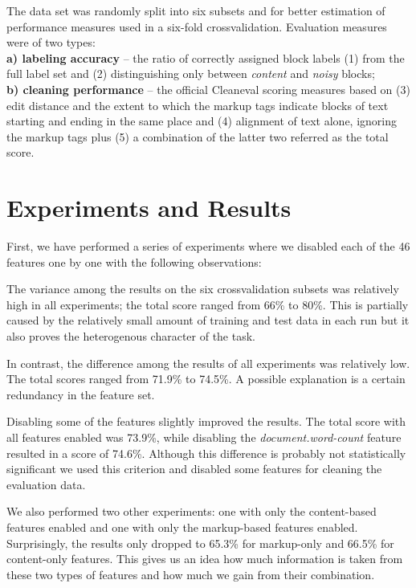 \documentclass[12pt,a4paper, fleqn, leqno, twoside]{article}
\begin{document}
The data set was randomly split into six subsets and for better estimation of performance measures used in a six-fold crossvalidation. Evaluation measures were of two types: \\
\noindent \textbf{a) labeling accuracy} -- the  ratio of correctly assigned block labels {\small(1)} from the full label set and {\small(2)} distinguishing only between \textit{content} and \textit{noisy} blocks;\\
\noindent \textbf{b) cleaning performance} -- the official Cleaneval scoring measures based on {\small(3)} edit distance and the extent to which the markup tags indicate blocks of text starting and ending in the same place and {\small(4)} alignment of text alone, ignoring the markup tags plus {\small (5)} a combination of the latter two referred as the total score.

\section{Experiments and Results}

First, we have performed a series of experiments where we disabled each of the 46 features one by one with the following observations:

The variance among the results on the six crossvalidation subsets was relatively high in all experiments; the total score ranged from 66\% to 80\%. This is partially caused by the relatively small amount of training and test data in each run but it also proves the heterogenous character of the task.

In contrast, the difference among the results of all experiments was relatively low. The total scores ranged from 71.9\% to 74.5\%. A possible explanation is a certain redundancy in the feature set.

Disabling some of the features slightly improved the
results. The total score with all features enabled was 73.9\%, while
disabling the {\it document.word-count} feature resulted in a score of
74.6\%. Although this difference is probably not statistically significant we used
this criterion and disabled some features for cleaning the evaluation
data.

We also performed two other experiments: one with only the content-based
features enabled and one with only the markup-based features enabled.
Surprisingly, the results only dropped to 65.3\% for markup-only and
66.5\% for content-only features. This gives us an idea how much information is taken from these two types of features and how much we gain from their combination.
\end{document}
